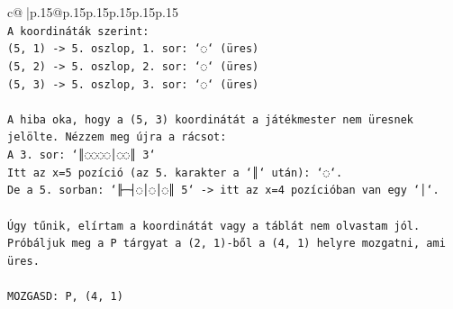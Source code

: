 \documentclass{article}
\begin{document}
{\begin{supertabular}{c@{$\;$}|p{.15\linewidth}@{}p{.15\linewidth}p{.15\linewidth}p{.15\linewidth}p{.15\linewidth}p{.15\linewidth}}
{{{\\ 
\texttt{A koordináták szerint:} \\
\texttt{(5, 1) {-}> 5. oszlop, 1. sor: `◌` (üres)} \\
\texttt{(5, 2) {-}> 5. oszlop, 2. sor: `◌` (üres)} \\
\texttt{(5, 3) {-}> 5. oszlop, 3. sor: `◌` (üres)} \\
\\ 
\texttt{A hiba oka, hogy a (5, 3) koordinátát a játékmester nem üresnek jelölte. Nézzem meg újra a rácsot:} \\
\texttt{A 3. sor: `║◌◌◌◌│◌◌║ 3`} \\
\texttt{Itt az x=5 pozíció (az 5. karakter a `║` után): `◌`.} \\
\texttt{De a 5. sorban: `╟─┤◌│◌│◌║ 5` {-}> itt az x=4 pozícióban van egy `│`.} \\
\\ 
\texttt{Úgy tűnik, elírtam a koordinátát vagy a táblát nem olvastam jól. Próbáljuk meg a P tárgyat a (2, 1){-}ből a (4, 1) helyre mozgatni, ami üres.} \\
\\ 
\texttt{MOZGASD: P, (4, 1)} \\
            }
        }
    }
     \\ \\


\end{supertabular}}
\end{document}
